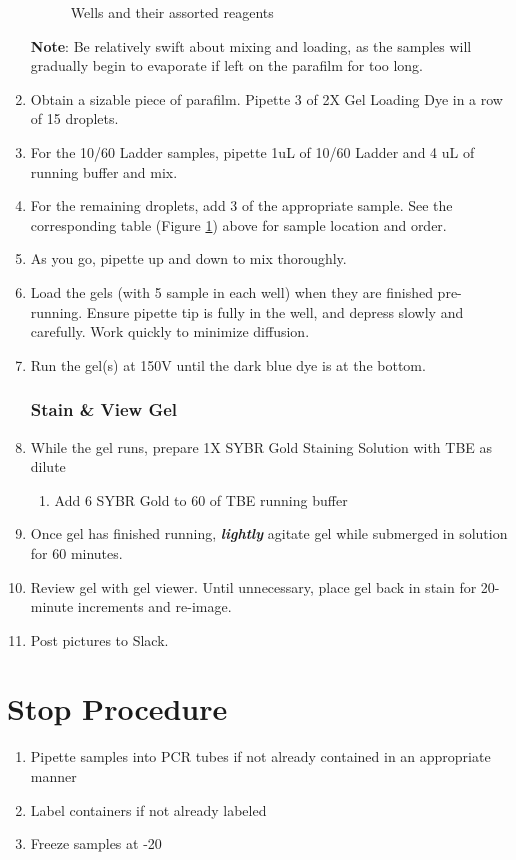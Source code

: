 \documentclass{ssiBio}
\begin{document}
\begin{enumerate}
\begin{figure}[ht]
\begin{center}
\begin{tabular}{|l|l|}
\end{tabular}
\label{tab:Gel Layout} %
\caption{Wells and their assorted reagents} %
\end{center}
\end{figure}
\textbf{Note}: Be relatively swift about mixing and loading, as the samples will gradually begin to evaporate if left on the parafilm for too long.
\item{Obtain a sizable piece of parafilm. Pipette 3 \uL{} of 2X Gel Loading Dye in a row of 15 droplets.}
\item{For the 10/60 Ladder samples, pipette 1uL of 10/60 Ladder and 4 uL of running buffer and mix.}
\item{For the remaining droplets, add 3 \uL{} of the appropriate sample. See the corresponding table (Figure \ref{tab:Gel Layout}) above for sample location and order.}
\item{As you go, pipette up and down to mix thoroughly.}
\item{Load the gels (with 5 \uL{} sample in each well) when they are finished pre-running. Ensure pipette tip is fully in the well, and depress slowly and carefully. Work quickly to minimize diffusion.}
\item{Run the gel(s) at 150V until the dark blue dye is at the bottom.}

\subsubsection{Stain \& View Gel}
\item{While the gel runs, prepare 1X SYBR Gold Staining Solution with TBE as dilute}
	\begin{enumerate}
		\item{Add 6\uL{} SYBR Gold to 60\uL{} of TBE running buffer}
	\end{enumerate}
\item{Once gel has finished running, \textbf{\textit{lightly}} agitate gel while submerged in solution for 60 minutes.}
\item{Review gel with gel viewer. Until unnecessary, place gel back in stain for 20-minute increments and re-image.}
\item{Post pictures to Slack.}\\
\end{enumerate} 

\section*{Stop Procedure}
\begin{enumerate}
\item{Pipette samples into PCR tubes if not already contained in an appropriate manner}
\item{Label containers if not already labeled}
\item{Freeze samples at -20\C{}}
\end{enumerate}
\newpage


\end{document}
